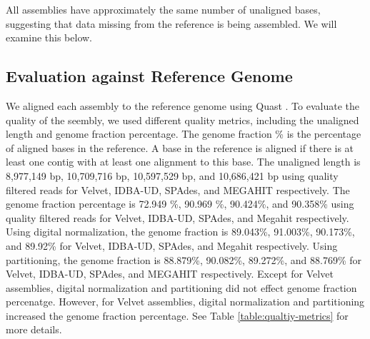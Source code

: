 All assemblies have approximately the same number of
unaligned bases, suggesting that data missing from the reference is
being assembled.  We will examine this below.





\subsection*{Evaluation against Reference Genome}   

We aligned each assembly to the reference genome using Quast \cite{quast}.  To evaluate the quality of the seembly, we used different quality metrics, including the unaligned length and genome fraction percentage.   The genome fraction \% is the percentage of
aligned bases in the reference. A base in the reference is aligned if
there is at least one contig with at least one alignment to this base. The unaligned
length is 8,977,149 bp, 10,709,716 bp, 10,597,529 bp, and
10,686,421 bp using quality filtered reads for Velvet, IDBA-UD, SPAdes,
and MEGAHIT respectively.
The genome fraction percentage is 72.949 \%, 90.969 \%, 90.424\%, and
90.358\% using quality filtered reads for Velvet, IDBA-UD, SPAdes, and
Megahit respectively.  Using digital normalization, the genome
fraction is 89.043\%, 91.003\%, 90.173\%, and 89.92\% for Velvet,
IDBA-UD, SPAdes, and Megahit respectively.  Using partitioning, the
genome fraction is 88.879\%, 90.082\%, 89.272\%, and 88.769\% for
Velvet, IDBA-UD, SPAdes, and MEGAHIT respectively.  Except for Velvet assemblies, digital
normalization and partitioning did not effect genome fraction percenatge. However, for Velvet assemblies, digital normalization and partitioning increased the genome fraction percentage. See
Table \ref{table:qualtiy-metrics} for more details.


